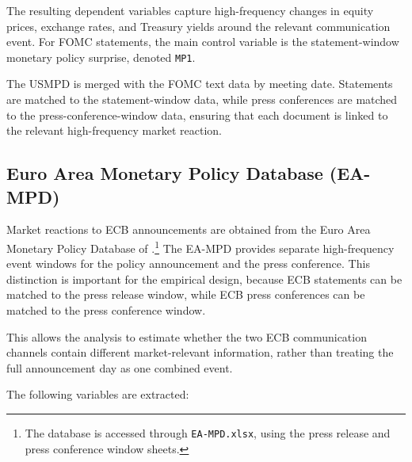 The resulting dependent variables capture high-frequency changes in
equity prices, exchange rates, and Treasury yields around the relevant
communication event. For FOMC statements, the main control variable is
the statement-window monetary policy surprise, denoted \texttt{MP1}.

The USMPD is merged with the FOMC text data by meeting date. Statements
are matched to the statement-window data, while press conferences are
matched to the press-conference-window data, ensuring that each document
is linked to the relevant high-frequency market reaction.

\subsection{Euro Area Monetary Policy Database (EA-MPD)}
\label{sec:data_eampd}

Market reactions to ECB announcements are obtained from the Euro Area
Monetary Policy Database of \citet{altavilla2019}.\footnote{The database
is accessed through \texttt{EA-MPD.xlsx}, using the press release and
press conference window sheets.} The EA-MPD provides separate
high-frequency event windows for the policy announcement and the press
conference. This distinction is important for the empirical design,
because ECB statements can be matched to the press release window, while
ECB press conferences can be matched to the press conference window.

This allows the analysis to estimate whether the two ECB communication
channels contain different market-relevant information, rather than
treating the full announcement day as one combined event.

The following variables are extracted:
 
